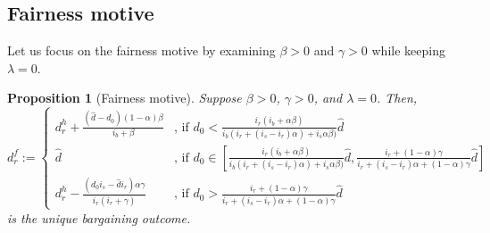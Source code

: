 \documentclass[a4paper,11pt]{article}
\newcommand{\dref}{\widehat d}
\newcommand{\dHyp}{d^h_r}
\renewcommand{\~}[1]{\tilde{#1}}
\renewcommand{\-}[1]{\overline{#1}}
\newtheorem{proposition}{Proposition}
\begin{document}
\newpage

\subsection{Fairness motive}
Let us focus on the fairness motive by examining $\beta>0$ and $\gamma>0$ while keeping $\lambda=0$.
\begin{proposition}[Fairness motive]\label{prop:fairness}
    Suppose $\beta>0$, $\gamma>0$, and $\lambda=0$. Then,
    \begin{equation}\label{eq:drf}
        d^{f}_r := \begin{cases}
        \dHyp + \frac{(\dref-d_0) (1 - \alpha) \beta}{i_b + \beta}
  & \text{, if } d_0 < \frac{ i_r (i_b + \alpha \beta)}{
  i_b (i_r + \left(i_s- i_r\right) \alpha) + i_s \alpha \beta)}\dref\\
  \dref & \text{, if }d_0\in\left[\frac{ i_r (i_b + \alpha \beta)}{
  i_b (i_r + \left(i_s- i_r\right) \alpha) + i_s \alpha \beta)}\dref,\frac{ i_r + \left(1- \alpha\right) \gamma}{i_r + (i_s-i_r) \alpha + (1-\alpha)\gamma}\dref\right]\\
  \dHyp-\frac{(d_0 i_s-\dref i_r) \alpha \gamma}{i_r (i_r + \gamma)} & \text{, if } d_0 >\frac{ i_r + \left(1- \alpha\right) \gamma}{i_r + (i_s-i_r) \alpha + (1-\alpha)\gamma}\dref
        \end{cases}
    \end{equation}
    is the unique bargaining outcome.
\end{proposition}
\end{document}
